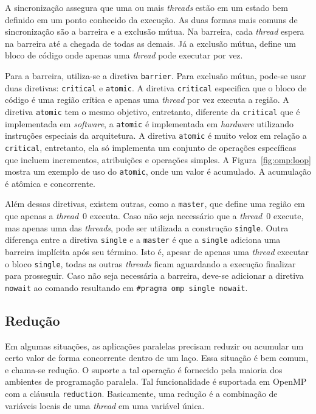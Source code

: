 A sincronização assegura que uma ou mais \textit{threads} estão em um estado bem definido em um ponto conhecido da execução. As duas formas mais comuns de sincronização são a barreira e a exclusão mútua. Na barreira, cada \textit{thread} espera na barreira até a chegada de todas as demais. Já a exclusão mútua, define um bloco de código onde apenas uma \textit{thread} pode executar por vez. 

Para a barreira, utiliza-se a diretiva \texttt{barrier}. Para exclusão mútua, pode-se usar duas diretivas: \texttt{critical} e \texttt{atomic}. 
A diretiva \texttt{critical} especifica que o bloco de código é uma região crítica e apenas uma \textit{thread} por vez executa a região. A diretiva \texttt{atomic} tem o mesmo objetivo, entretanto, diferente da \texttt{critical} que é implementada em \textit{software}, a \texttt{atomic} é implementada em \textit{hardware} utilizando instruções especiais da arquitetura. 
A diretiva \texttt{atomic} é muito veloz em relação a \texttt{critical}, entretanto, ela só implementa um conjunto de operações específicas que incluem incrementos, atribuições e operações simples. A Figura~\ref{fig:omp:loop} mostra um exemplo de uso do \texttt{atomic}, onde um valor é acumulado. A acumulação é atômica e concorrente.

Além dessas diretivas, existem outras, como a \texttt{master}, que define uma região em que apenas a \textit{thread}~0 executa. Caso não seja necessário que a \textit{thread}~0 execute, mas apenas uma das \emph{threads}, pode ser utilizada a construção \texttt{single}. Outra diferença entre a diretiva \texttt{single} e a \texttt{master} é que a \texttt{single} adiciona uma barreira implícita após seu término. Isto é, apesar de apenas uma \textit{thread} executar o bloco \texttt{single}, todas as outras \textit{threads} ficam aguardando a execução finalizar para prosseguir. Caso não seja necessária a barreira, deve-se adicionar a diretiva \texttt{nowait} ao comando resultando em \texttt{\#pragma omp single nowait}.

\subsection{Redução}

Em algumas situações, as aplicações paralelas precisam reduzir ou acumular um certo valor de forma concorrente dentro de um laço. Essa situação é bem comum, e chama-se redução. O suporte a tal operação é fornecido pela maioria dos ambientes de programação paralela. Tal funcionalidade é suportada em OpenMP com a cláusula \texttt{reduction}. Basicamente, uma redução é a combinação de variáveis locais de uma \textit{thread} em uma variável única. 

